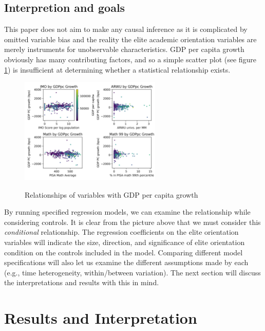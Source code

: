 \documentclass[11pt]{article}
\begin{document}
\subsection{Interpretion and goals}
This paper does not aim to make any causal inference as it is complicated by omitted variable bias and the reality the elite academic orientation variables are merely instruments for unobservable characteristics. GDP per capita growth obviously has many contributing factors, and so a simple scatter plot (see figure \ref{fig:relationships}) is insufficient at determining whether a statistical relationship exists.
\begin{figure}[H]
    \caption{Relationships of variables with GDP per capita growth}
    \centering
    \includegraphics[width=0.6\textwidth]{../charts/relationships.png}
    \label{fig:relationships}
\end{figure}
By running specified regression models, we can examine the relationship while considering controls. It is clear from the picture above that we must consider this \textit{conditional} relationship. The regression coefficients on the elite orientation variables will indicate the size, direction, and significance of elite orientation condition on the controls included in the model. Comparing different model specifications will also let us examine the different assumptions made by each (e.g., time heterogeneity, within/between variation). The next section will discuss the interpretations and results with this in mind.
\section{Results and Interpretation}
\end{document}
